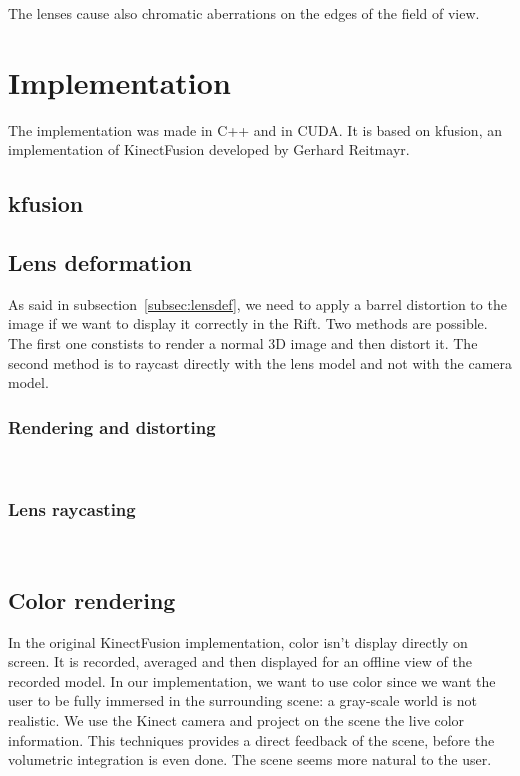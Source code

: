 \documentclass[12pt]{article}
\begin{document}
The lenses cause also chromatic aberrations on the edges of the field of view.

\newpage
\section{Implementation}
The implementation was made in C++ and in CUDA. It is based on kfusion, an implementation of KinectFusion developed by Gerhard Reitmayr.

\subsection{kfusion}


\subsection{Lens deformation}
\label{subsec:deformation}
As said in subsection~\ref{subsec:lensdef}, we need to apply a barrel distortion to the image if we want to display it correctly in the Rift. Two methods are possible. The first one constists to render a normal 3D image and then distort it. The second method is to raycast directly with the lens model and not with the camera model.

\subsubsection{Rendering and distorting} ~\\


\subsubsection{Lens raycasting} ~\\


\subsection{Color rendering}
In the original KinectFusion implementation, color isn't display directly on screen. It is recorded, averaged and then displayed for an offline view of the recorded model. In our implementation, we want to use color since we want the user to be fully immersed in the surrounding scene: a gray-scale world is not realistic. We use the Kinect camera and project on the scene the live color information. This techniques provides a direct feedback of the scene, before the volumetric integration is even done. The scene seems more natural to the user.
\end{document}
